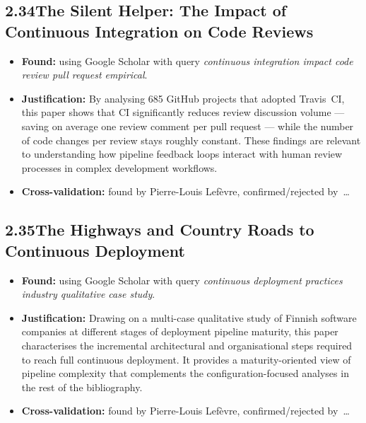 \documentclass[a4paper,11pt]{article}
\begin{document}
\subsection*{2.34\quad The Silent Helper: The Impact of Continuous Integration on Code Reviews~\cite{cassee2020silent}}

\begin{itemize}[leftmargin=1.5em]
  \item \textbf{Found:} using Google Scholar with query \textit{continuous integration impact code review pull request empirical}.
  \item \textbf{Justification:} By analysing 685 GitHub projects that adopted Travis~CI, this paper shows that CI significantly reduces review discussion volume --- saving on average one review comment per pull request --- while the number of code changes per review stays roughly constant. These findings are relevant to understanding how pipeline feedback loops interact with human review processes in complex development workflows.
  \item \textbf{Cross-validation:} found by Pierre-Louis Lef\`evre, confirmed/rejected by~\ldots
\end{itemize}

\subsection*{2.35\quad The Highways and Country Roads to Continuous Deployment~\cite{leppanen2015highways}}

\begin{itemize}[leftmargin=1.5em]
  \item \textbf{Found:} using Google Scholar with query \textit{continuous deployment practices industry qualitative case study}.
  \item \textbf{Justification:} Drawing on a multi-case qualitative study of Finnish software companies at different stages of deployment pipeline maturity, this paper characterises the incremental architectural and organisational steps required to reach full continuous deployment. It provides a maturity-oriented view of pipeline complexity that complements the configuration-focused analyses in the rest of the bibliography.
  \item \textbf{Cross-validation:} found by Pierre-Louis Lef\`evre, confirmed/rejected by~\ldots
\end{itemize}
\end{document}
